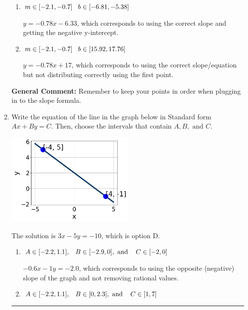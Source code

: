 \documentclass{extbook}[14pt]
\newcommand{\litem}[1]{\item #1

\rule{\textwidth}{0.4pt}}
\begin{document}
\begin{enumerate}
{\begin{enumerate}[label=\Alph*.]
 $y = 0.78x + 1.67$, which corresponds to using the negative slope and the correct equation.
\item \( m \in [-2.1, -0.7] \hspace*{3mm} b \in [-6.81, -5.38] \)

 $y = -0.78x -6.33$, which corresponds to using the correct slope and getting the negative y-intercept.
\item \( m \in [-2.1, -0.7] \hspace*{3mm} b \in [15.92, 17.76] \)

 $y = -0.78x + 17$, which corresponds to using the correct slope/equation but not distributing correctly using the first point.
\end{enumerate}

\textbf{General Comment:} Remember to keep your points in order when plugging in to the slope formula.
}
\litem{
Write the equation of the line in the graph below in Standard form $Ax+By=C$. Then, choose the intervals that contain $A, B, \text{ and } C$.

\begin{center}
    \includegraphics[width=0.5\textwidth]{../Figures/linearGraphToStandardCopyA.png}
\end{center}



The solution is \( 3x - 5y = -10 \), which is option D.\begin{enumerate}[label=\Alph*.]
\item \( A \in [-2.2, 1.1], \hspace{3mm} B \in [-2.9, 0], \text{ and } \hspace{3mm} C \in [-2, 0] \)

 $-0.6x - 1y = -2.0$, which corresponds to using the opposite (negative) slope of the graph and not removing rational values.
\item \( A \in [-2.2, 1.1], \hspace{3mm} B \in [0, 2.3], \text{ and } \hspace{3mm} C \in [1, 7] \)


\end{enumerate}}
\end{enumerate}
\end{document}

